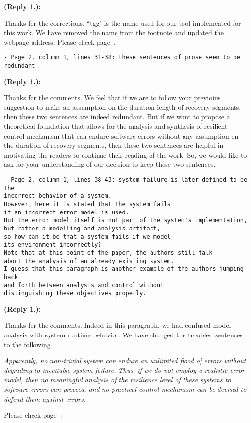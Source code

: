\documentclass[times,10pt,twocolumn]{article}
\newcounter{cabbage0}
\newcounter{cabbage1}
\newcounter{cabbage2}
\newcounter{cabbage3}
\newcounter{bean0}
\newcounter{bean1}
\newcounter{bean2}
\newcounter{bean3}
\newcounter{bean4}
\newcounter{bean5}
\newcounter{bean6}
\newenvironment{reply1}{\begin{list}{\bf (Reply 1.\arabic{bean1}):} 
        {\usecounter{bean1}\setcounter{bean1}{\value{cabbage1}} \item \setcounter{cabbage1}{\value{bean1}} 
        }
}{\end{list}}
\begin{document}
\begin{reply1} 
Thanks for the corrections. 
``tgg" is the name used for our tool implemented for this work. 
We have removed the name from the footnote and updated the webpage address. 
Please check page~\pageref{reply1.tgg}. 
\end{reply1} 
\begin{verbatim}
- Page 2, column 1, lines 31-38: these sentences of prose seem to be redundant
\end{verbatim}
\begin{reply1} 
Thanks for the comments. 
We feel that if we are to follow your previoius suggestion to make an assumption 
on the duration length of recovery segments, then these two sentences 
are indeed redundant. 
But if we want to propose a theoretical foundation that 
allows for the analysis and synthesis of resilient control mechanism 
that can endure software errors without any assumption on the duration of 
recovery segments, then these two sentences are helpful in motivating the 
readers to continue their reading of the work. 
So, we would like to ask for your understanding of our decision to keep these 
two sentences.  
\end{reply1} 
\begin{verbatim}
- Page 2, column 1, lines 38-43: system failure is later defined to be the 
incorrect behavior of a system. 
However, here it is stated that the system fails 
if an incorrect error model is used. 
But the error model itself is not part of the system's implementation, 
but rather a modelling and analysis artifact, 
so how can it be that a system fails if we model 
its environment incorrectly? 
Note that at this point of the paper, the authors still talk 
about the analysis of an already existing system. 
I guess that this paragraph is another example of the authors jumping back 
and forth between analysis and control without 
distinguishing these objectives properly.
\end{verbatim}
\begin{reply1} 
Thanks for the comments. 
Indeed in this paragraph, we had confused model analysis with system runtime behavior.
We have changed the troubled sentences to the following. 
\begin{center} 
\parbox{140mm}{\em 
Apparently, no non-trivial system can endure an unlimited flood of errors without 
degrading to inevitable system failure. 
Thus, if we do not employ a realistic error model, then 
no meaningful analysis of the resilience level of these systems to software errors can proceed, 
and no practical control mechanism can be devised to defend them against errors.   
}
\end{center} 
Please check page~\pageref{reply1.realistic.system.failure}.  
\end{reply1} 
\end{document}
